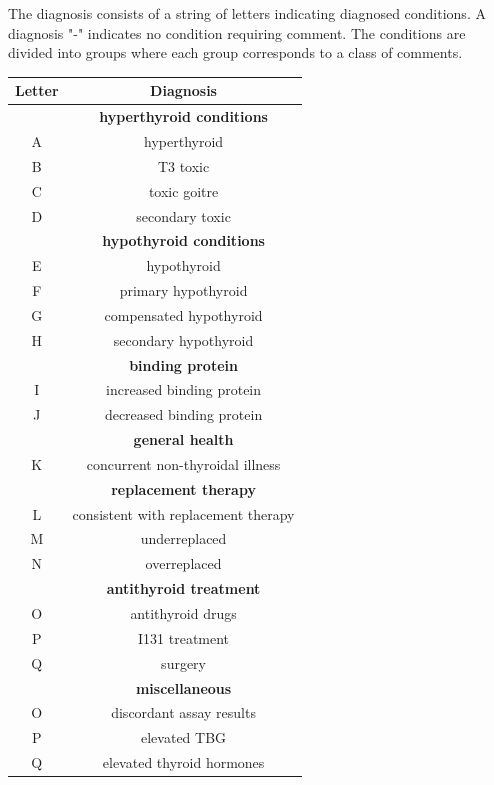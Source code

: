 \documentclass{article}
\begin{document}
The diagnosis consists of a string of letters indicating diagnosed conditions. A diagnosis "-" indicates no condition requiring comment. The
conditions are divided into groups where each group corresponds to a class of comments.

\begin{center}
\begin{tabular}{c | c }
\textbf{Letter} & \textbf{Diagnosis}  \\ \hline
& \textbf{hyperthyroid conditions} \\
A & hyperthyroid \\
B & T3 toxic \\
C & toxic goitre \\
D & secondary toxic \\ \hline

& \textbf{hypothyroid conditions} \\
E & hypothyroid \\
F & primary hypothyroid \\
G & compensated hypothyroid \\
H & secondary hypothyroid \\ \hline

& \textbf{binding protein} \\
I & increased binding protein \\
J & decreased binding protein \\ \hline

& \textbf{general health} \\
K & concurrent non-thyroidal illness \\ \hline

& \textbf{replacement therapy} \\
L & consistent with replacement therapy \\
M & underreplaced \\
N & overreplaced \\ \hline

& \textbf{antithyroid treatment} \\
O & antithyroid drugs \\
P & I131 treatment \\
Q & surgery \\ \hline

& \textbf{miscellaneous} \\
O & discordant assay results \\
P & elevated TBG \\
Q & elevated thyroid hormones \\ \hline

\end{tabular}
\label{table:cvalue1}
\end{center}
\end{document}

